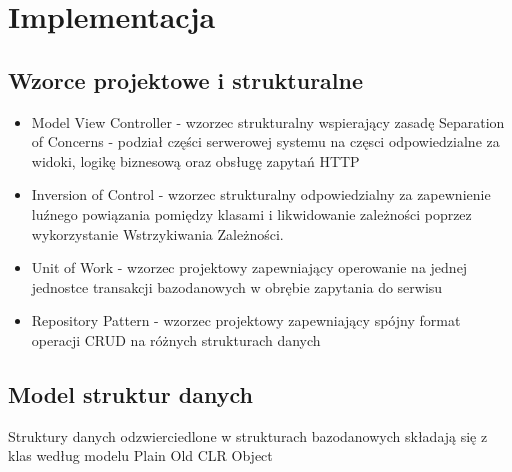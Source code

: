 \newpage\section{Implementacja} \label{sec:implementacja}
\subsection{Wzorce projektowe i strukturalne}
\begin{itemize}  
    \item Model View Controller - wzorzec strukturalny wspierający zasadę Separation of Concerns - podział części serwerowej systemu na częsci odpowiedzialne za widoki, logikę biznesową oraz obsługę zapytań HTTP
    \item Inversion of Control - wzorzec strukturalny odpowiedzialny za zapewnienie luźnego powiązania pomiędzy klasami i likwidowanie zależności poprzez wykorzystanie Wstrzykiwania Zależności.
    \item Unit of Work - wzorzec projektowy zapewniający operowanie na jednej jednostce transakcji bazodanowych w obrębie zapytania do serwisu
    \item Repository Pattern - wzorzec projektowy zapewniający spójny format operacji CRUD na różnych strukturach danych 
\end{itemize}
\subsection{Model struktur danych}
Struktury danych odzwierciedlone w strukturach bazodanowych składają się z klas według modelu Plain Old CLR Object
